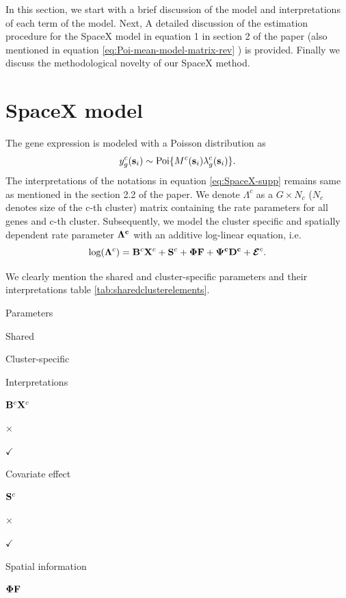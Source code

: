 \documentclass[
]{book}
\begin{document}
In this section, we start with a brief discussion of the model and interpretations of each term of the model. Next, A detailed discussion of the estimation procedure for the SpaceX model in equation 1 in section 2 of the paper (also mentioned in equation \eqref{eq:Poi-mean-model-matrix-rev} ) is provided. Finally we discuss the methodological novelty of our SpaceX method.

\hypertarget{spacex-model}{%
\section{SpaceX model}\label{spacex-model}}

The gene expression is modeled with a Poisson distribution as
\begin{equation}
y^{c}_{g}({\bf s}_{i}) \sim \text{Poi}\{ M^{c}({\bf s}_{i}) \lambda^{c}_{g}({\bf s}_{i})\}.
\label{eq:SpaceX-supp}
\end{equation}
The interpretations of the notations in equation \eqref{eq:SpaceX-supp} remains same as mentioned in the section 2.2 of the paper. We denote \(\Lambda^{c}\) as a \(G \times N_{c}\) (\(N_{c}\) denotes size of the c-th cluster) matrix containing the rate parameters for all genes and c-th cluster.
Subsequently, we model the cluster specific and spatially dependent rate parameter \(\bf \Lambda^{c}\) with an additive log-linear equation, i.e.~
\begin{equation}
\text{log}({\bf \Lambda}^{c}) = {\bf B}^{c}{\bf X}^{c} + {\bf S}^{c} + {\bf \Phi F} + {\bf \Psi^{c} D^{c}} + {\boldsymbol{\mathcal{E}}}^{c}.
\label{eq:Poi-mean-model-matrix-rev}
\end{equation}

We clearly mention the shared and cluster-specific parameters and their interpretations table \ref{tab:sharedclusterelements}.

Parameters

Shared

Cluster-specific

Interpretations

\({\bf B}^{c}{\bf X}^{c}\)

\(\times\)

\(\checkmark\)

Covariate effect

\({\bf S}^{c}\)

\(\times\)

\(\checkmark\)

Spatial information

\({\bf \Phi F}\)
\end{document}
